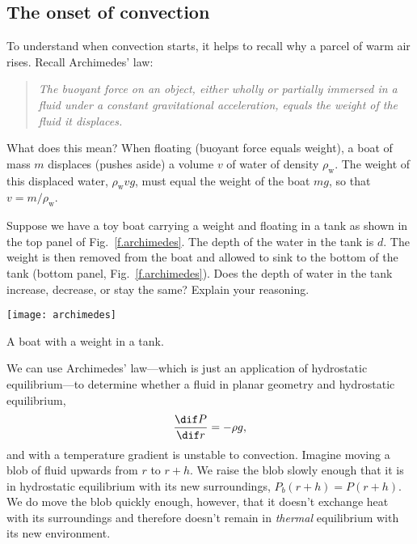 \subsection{The onset of convection}\label{s.convection-onset}

To understand when convection starts, it helps to recall why a parcel of warm air rises. Recall Archimedes' law:
\begin{quote}\itshape
The buoyant force on an object, either wholly or partially immersed in a fluid under a constant gravitational acceleration, equals the weight of the fluid it displaces.
\end{quote}
What does this mean? When floating (buoyant force equals weight), a boat of mass $m$ displaces (pushes aside) a volume $v$ of water of density $\rho_{\mathrm{w}}$. The weight of this displaced water, $\rho_{\mathrm{w}}v g$, must equal the weight of the boat $mg$, so that $v = m/\rho_{\mathrm{w}}$.

\begin{exercisebox}
Suppose we have a toy boat carrying a weight and floating in a tank as shown in the top panel of Fig.~\ref{f.archimedes}. The depth of the water in the tank is $d$. The weight is then removed from the boat and allowed to sink to the bottom of the tank (bottom panel, Fig.~\ref{f.archimedes}). Does the depth of water in the tank increase, decrease, or stay the same? Explain your reasoning.
\end{exercisebox}
\begin{marginfigure}[-6\baselineskip]
\texttt{[image: archimedes]}
\caption[A boat with a weight]{\label{f.archimedes} A boat with a weight in a tank.}
\end{marginfigure}

We can use Archimedes' law---which is just an application of hydrostatic equilibrium---to determine whether a fluid in planar geometry and hydrostatic equilibrium,
\begin{equation}
\frac{\dif P}{\dif r} = -\rho g,
\end{equation}
and with a temperature gradient is unstable to convection. Imagine moving a blob of fluid upwards from $r$ to $r+h$.  We raise the blob slowly enough that it is in hydrostatic equilibrium with its new surroundings, $P_{b}(r+h) = P(r+h)$. We do move the blob quickly enough, however, that it doesn't exchange heat with its surroundings and therefore doesn't remain in \emph{thermal} equilibrium with its new environment. 

